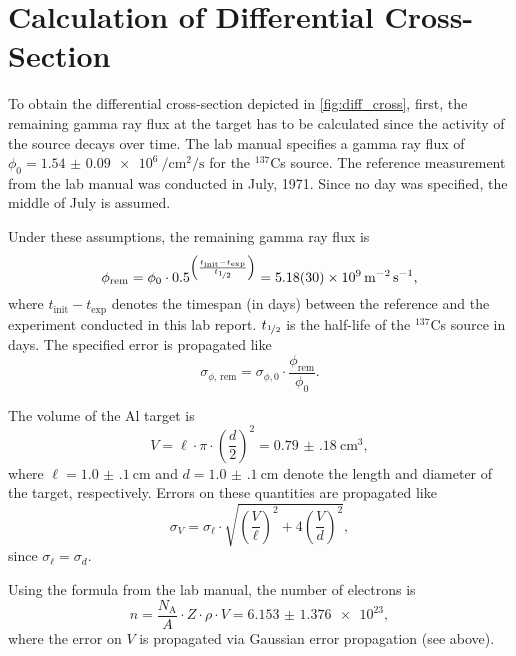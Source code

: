 \Appendix
\configureappendix

\section{Calculation of Differential Cross-Section}\label{appendix:cross}

To obtain the differential cross-section depicted in \autoref{fig:diff_cross}, first, the remaining gamma ray flux at the target has to be calculated since the activity of the source decays over time.
The lab manual specifies a gamma ray flux of $\phi_0 = \SI{1.54(9)e6}{\per\cm\squared\per\second}$ for the $^{137}$Cs source.
The reference measurement from the lab manual was conducted in July, 1971.
Since no day was specified, the middle of July is assumed.

Under these assumptions, the remaining gamma ray flux is
\begin{equation*}
	\phi_\text{rem} = \phi_0\cdot 0.5^{\left(\frac{t_\text{init}-t_\text{exp}}{t_{\nicefrac{1}{2}}}\right)} = \SI{5.18(30)e9}{\per\meter\squared\per\second},
\end{equation*}
where $t_\text{init}-t_\text{exp}$ denotes the timespan (in days) between the reference and the experiment conducted in this lab report.
$t_{\nicefrac{1}{2}}$ is the half-life of the $^{137}$Cs source in days.
The specified error is propagated like
\begin{equation*}
	\sigma_{\phi\text{, rem}} = \sigma_{\phi,0}\cdot\frac{\phi_\text{rem}}{\phi_0}.
\end{equation*}

The volume of the Al target is
\begin{equation*}
	V = \ell\cdot\pi\cdot\left(\frac{d}{2}\right)^2 = \SI{0.79(18)}{\cm\cubed},
\end{equation*}
where $\ell=\SI{1.0(1)}{\cm}$ and $d=\SI{1.0(1)}{\cm}$ denote the length and diameter of the target, respectively.
Errors on these quantities are propagated like
\begin{equation*}
	\sigma_V = \sigma_\ell\cdot\sqrt{\left(\frac{V}{\ell}\right)^2 + 4\left(\frac{V}{d}\right)^2},
\end{equation*}
since $\sigma_\ell=\sigma_d$.

Using the formula from the lab manual, the number of electrons is
\begin{equation*}
	n = \frac{N_\text{A}}{A}\cdot Z\cdot\rho\cdot V = \num{6.153(1376)e23},
\end{equation*}
where the error on $V$ is propagated via Gaussian error propagation (see above).


